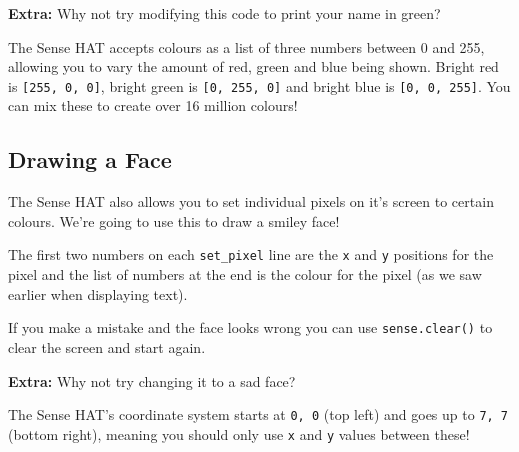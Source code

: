 		\textbf{Extra:} Why not try modifying this code to print your name in green?

		\begin{aside}
			The Sense HAT accepts colours as a list of three numbers between 0 and 255, allowing you to vary the amount of red, green and blue being shown. Bright red is \texttt{[255, 0, 0]}, bright green is \texttt{[0, 255, 0]} and bright blue is \texttt{[0, 0, 255]}. You can mix these to create over 16 million colours!
		\end{aside}

	\subsection{Drawing a Face}

		The Sense HAT also allows you to set individual pixels on it's screen to certain colours. We're going to use this to draw a smiley face!

		

		The first two numbers on each \texttt{set\_pixel} line are the \texttt{x} and \texttt{y} positions for the pixel and the list of numbers at the end is the colour for the pixel (as we saw earlier when displaying text).

		If you make a mistake and the face looks wrong you can use \texttt{sense.clear()} to clear the screen and start again.

		\textbf{Extra:} Why not try changing it to a sad face?

		\begin{aside}
			The Sense HAT's coordinate system starts at \texttt{0, 0} (top left) and goes up to \texttt{7, 7} (bottom right), meaning you should only use \texttt{x} and \texttt{y} values between these!
		\end{aside}
